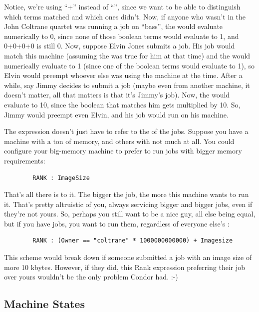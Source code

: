 Notice, we're using ``+'' instead of ``\Bar\Bar'', since we want to be able
to distinguish which terms matched and which ones didn't.  Now, if
anyone who wasn't in the John Coltrane quartet was running a job on
``bass'', the  would evaluate numerically to 0, since none
of those boolean terms would evaluate to 1, and 0+0+0+0 is still 0.
Now, suppose Elvin Jones submits a job.  His job would match this
machine (assuming the  was true for him at that time) and
the  would numerically evaluate to 1 (since one of the
boolean terms would evaluate to 1), so Elvin would preempt whoever
else was using the machine at the time.  After a while, say Jimmy
decides to submit a job (maybe even from another machine, it doesn't
matter, all that matters is that it's Jimmy's job).  Now, the
 would evaluate to 10, since the boolean that matches him
gets multiplied by 10.  So, Jimmy would preempt even Elvin, and his
job would run on his machine.

The  expression doesn't just have to refer to the
 of the jobs.  Suppose you have a machine with a ton of
memory, and others with not much at all.  You could configure your
big-memory machine to prefer to run jobs with bigger memory
requirements:
\begin{verbatim}
        RANK : ImageSize
\end{verbatim}

That's all there is to it.  The bigger the job, the more this machine
wants to run it.  That's pretty altruistic of you, always servicing
bigger and bigger jobs, even if they're not yours.  So, perhaps you
still want to be a nice guy, all else being equal, but if you have
jobs, you want to run them, regardless of everyone else's
:
\begin{verbatim}
        RANK : (Owner == "coltrane" * 1000000000000) + Imagesize
\end{verbatim}

This scheme would break down if someone submitted a job with an image
size of more 10 kbytes.  However, if they did, this Rank expression
preferring their job over yours wouldn't be the only problem Condor
had. :-)


\subsection{Machine States}
\label{sec:States}

